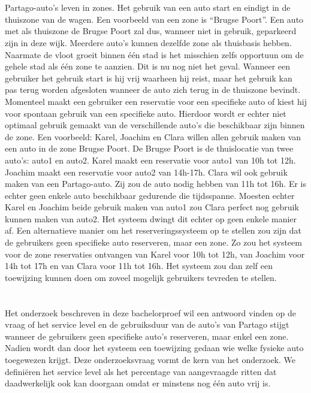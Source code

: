 \section{}
\label{sec:probleemstelling}
Partago-auto's leven in zones. Het gebruik van een auto start en eindigt in de thuiszone van de wagen. Een voorbeeld van een zone is ``Brugse Poort''. Een auto met als thuiszone de Brugse Poort zal dus, wanneer niet in gebruik, geparkeerd zijn in deze wijk. Meerdere auto's kunnen dezelfde zone als thuisbasis hebben. Naarmate de vloot groeit binnen één stad is het misschien zelfs opportuun om de gehele stad als één zone te aanzien. Dit is nu nog niet het geval. Wanneer een gebruiker het gebruik start is hij vrij waarheen hij reist, maar het gebruik kan pas terug worden afgesloten wanneer de auto zich terug in de thuiszone bevindt. Momenteel maakt een gebruiker een reservatie voor een specifieke auto of kiest hij voor spontaan gebruik van een specifieke auto. Hierdoor wordt er echter niet optimaal gebruik gemaakt van de verschillende auto's die beschikbaar zijn binnen de zone. Een voorbeeld: Karel, Joachim en Clara willen allen gebruik maken van een auto in de zone Brugse Poort. De Brugse Poort is de thuislocatie van twee auto's: auto1 en auto2. Karel maakt een reservatie voor auto1 van 10h tot 12h. Joachim maakt een reservatie voor auto2 van 14h-17h. Clara wil ook gebruik maken van een Partago-auto. Zij zou de auto nodig hebben van 11h tot 16h. Er is echter geen enkele auto beschikbaar gedurende die tijdsspanne. Moesten echter Karel en Joachim beide gebruik maken van auto1 zou Clara perfect nog gebruik kunnen maken van auto2. Het systeem dwingt dit echter op geen enkele manier af. Een alternatieve manier om het reserveringssysteem op te stellen zou zijn dat de gebruikers geen specifieke auto reserveren, maar een zone. Zo zou het systeem voor de zone reservaties ontvangen van Karel voor 10h tot 12h, van Joachim voor 14h tot 17h en van Clara voor 11h tot 16h. Het systeem zou dan zelf een toewijzing kunnen doen om zoveel mogelijk gebruikers tevreden te stellen.

\section{}
\label{sec:onderzoeksvraag}

Het onderzoek beschreven in deze bachelorproef wil een antwoord vinden op de vraag of het service level en de gebruiksduur van de auto's van Partago stijgt wanneer de gebruikers geen specifieke auto's reserveren, maar enkel een zone. Nadien wordt dan door het systeem een toewijzing gedaan wie welke fysieke auto toegewezen krijgt. Deze onderzoeksvraag vormt de kern van het onderzoek. We definiëren het service level als het percentage van aangevraagde ritten dat daadwerkelijk ook kan doorgaan omdat er minstens nog één auto vrij is.


